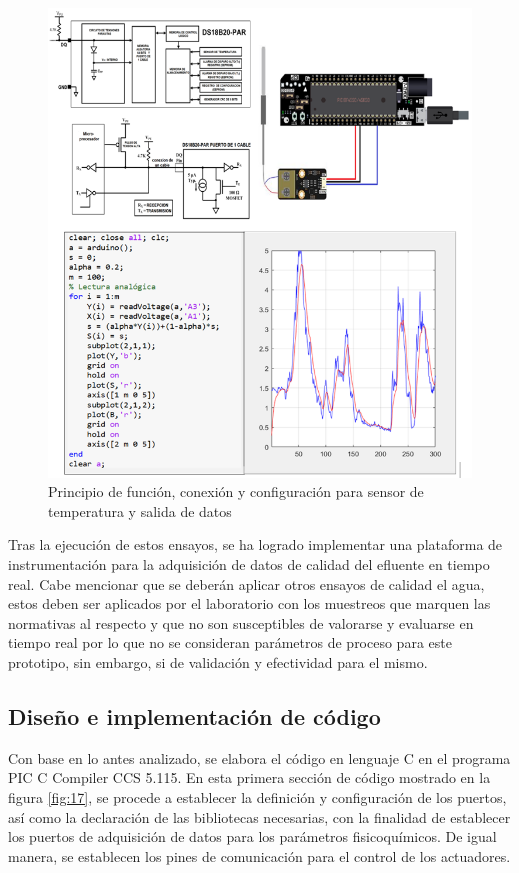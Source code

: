 \documentclass[conference]{IEEEtran}
\begin{document}
\begin{figure}[htbp]
	\centering
	\includegraphics[width=0.9\columnwidth]{fig16.png}
	\caption{Principio de función, conexión y configuración para sensor de temperatura y salida de datos}
	\label{fig:16}
\end{figure}

Tras la ejecución de estos ensayos, se ha logrado implementar una plataforma de instrumentación para la adquisición de datos de calidad del efluente en tiempo real. Cabe mencionar que se deberán aplicar otros ensayos de calidad el agua, estos deben ser aplicados por el laboratorio con los muestreos que marquen las normativas al respecto y que no son susceptibles de valorarse y evaluarse en tiempo real por lo que no se consideran parámetros de proceso para este prototipo, sin embargo, si de validación y efectividad para el mismo.

\subsection{Diseño e implementación de código}

Con base en lo antes analizado, se elabora el código en lenguaje C en el programa PIC C Compiler CCS 5.115. En esta primera sección de código mostrado en la figura \ref{fig:17}, se procede a establecer la definición y configuración de los puertos, así como la declaración de las bibliotecas necesarias, con la finalidad de establecer los puertos de adquisición de datos para los parámetros fisicoquímicos. De igual manera, se establecen los pines de comunicación para el control de los actuadores.
\end{document}

